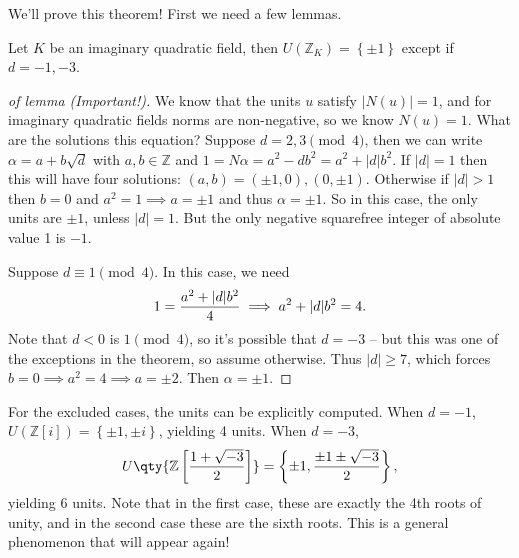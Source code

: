 We'll prove this theorem! First we need a few lemmas.

\begin{lemma}[?]

Let \(K\) be an imaginary quadratic field, then
\(U({\mathbb{Z}}_K) = \left\{{\pm 1 }\right\}\) except if \(d=-1, -3\).

\end{lemma}

\begin{proof}[of lemma (Important!)]

We know that the units \(u\) satisfy
\({\left\lvert {N(u)} \right\rvert} = 1\), and for imaginary quadratic
fields norms are non-negative, so we know \(N(u) = 1\). What are the
solutions this equation? Suppose \(d=2,3 \pmod 4\), then we can write
\(\alpha = a + b \sqrt{d}\) with \(a,b\in {\mathbb{Z}}\) and
\(1 = N \alpha = a^2 - db^2 = a^2 + {\left\lvert {d} \right\rvert}b^2\).
If \({\left\lvert {d} \right\rvert}= 1\) then this will have four
solutions: \((a, b) = (\pm 1, 0), (0, \pm 1)\). Otherwise if
\({\left\lvert {d} \right\rvert}> 1\) then \(b=0\) and
\(a^2=1 \implies a = \pm 1\) and thus \(\alpha = \pm 1\). So in this
case, the only units are \(\pm 1\), unless
\({\left\lvert {d} \right\rvert} = 1\). But the only negative squarefree
integer of absolute value 1 is \(-1\).

Suppose \(d \equiv 1 \pmod 4\). In this case, we need
\begin{align*}
1 = {a^2 + {\left\lvert {d} \right\rvert} b^2 \over 4} \implies a^2 + {\left\lvert {d} \right\rvert}b^2 = 4  
.\end{align*}
Note that \(d<0\) is \(1\pmod 4\), so it's possible that \(d=-3\) -- but
this was one of the exceptions in the theorem, so assume otherwise. Thus
\({\left\lvert {d} \right\rvert}\geq 7\), which forces
\(b=0 \implies a^2 = 4 \implies a = \pm 2\). Then \(\alpha= \pm 1\).

\end{proof}

\begin{remark}

For the excluded cases, the units can be explicitly computed. When
\(d=-1\), \(U({\mathbb{Z}}[i]) =\left\{{\pm 1, \pm i}\right\}\),
yielding 4 units. When \(d=-3\),
\begin{align*}
U\qty{{\mathbb{Z}}\left[ {1 + \sqrt{-3} \over 2 } \right]} = \left\{{\pm 1, {\pm 1 \pm \sqrt{-3} \over 2}}\right\}
,\end{align*}
yielding 6 units. Note that in the first case, these are exactly the 4th
roots of unity, and in the second case these are the sixth roots. This
is a general phenomenon that will appear again!

\end{remark}

